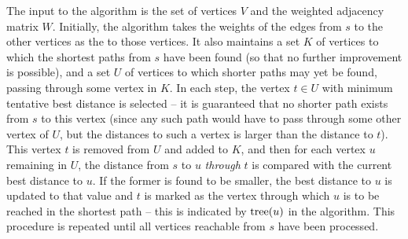 The input to the algorithm is the set of vertices $V$ and the weighted adjacency matrix $W$. Initially, the algorithm takes the weights of the edges from $s$ to the other vertices as the  to those vertices. It also maintains a set $K$ of vertices to which the shortest paths from $s$ have been found (so that no further improvement is possible), and a set $U$ of vertices to which shorter paths may yet be found, passing through some vertex in $K$. In each step, the vertex $t \in U$ with minimum tentative best distance is selected -- it is guaranteed that no shorter path exists from $s$ to this vertex (since any such path would have to pass through some other vertex of $U$, but the distances to such a vertex is larger than the distance to $t$). This vertex $t$ is removed from $U$ and added to $K$, and then for each vertex $u$ remaining in $U$, the distance from $s$ to $u$ \emph{through} $t$ is compared with the current best distance to $u$. If the former is found to be smaller, the best distance to $u$ is updated to that value and $t$ is marked as the vertex through which $u$ is to be reached in the shortest path -- this is indicated by $\operatorname{tree}(u)$ in the algorithm. This procedure is repeated until all vertices reachable from $s$ have been processed.

